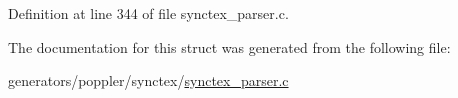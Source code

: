 Definition at line 344 of file synctex\+\_\+parser.\+c.



The documentation for this struct was generated from the following file\+:\begin{DoxyCompactItemize}
\item 
generators/poppler/synctex/\hyperlink{synctex__parser_8c}{synctex\+\_\+parser.\+c}\end{DoxyCompactItemize}
